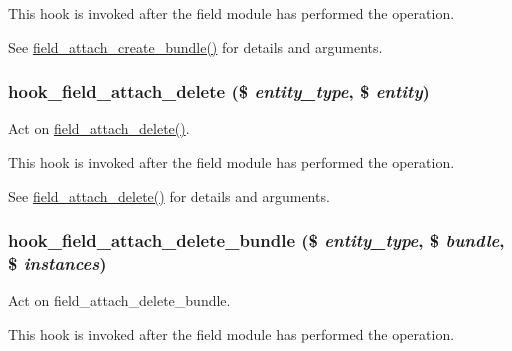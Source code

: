 This hook is invoked after the field module has performed the operation.

See \hyperlink{group__field__attach_gab3649772ef7a6416b013a4a556ce51bf}{field\_\-attach\_\-create\_\-bundle()} for details and arguments. \hypertarget{group__field__attach_gac9e5a9e43f1290315db8b593b9516094}{
\subsubsection[{hook\_\-field\_\-attach\_\-delete}]{\setlength{\rightskip}{0pt plus 5cm}hook\_\-field\_\-attach\_\-delete (\$ {\em entity\_\-type}, \/  \$ {\em entity})}}
\label{group__field__attach_gac9e5a9e43f1290315db8b593b9516094}
Act on \hyperlink{group__field__attach_gac2e3658c9c02d0d0e71359f9ef2f207a}{field\_\-attach\_\-delete()}.

This hook is invoked after the field module has performed the operation.

See \hyperlink{group__field__attach_gac2e3658c9c02d0d0e71359f9ef2f207a}{field\_\-attach\_\-delete()} for details and arguments. \hypertarget{group__field__attach_gac2aac33854dd18a2037a13b133c26481}{
\subsubsection[{hook\_\-field\_\-attach\_\-delete\_\-bundle}]{\setlength{\rightskip}{0pt plus 5cm}hook\_\-field\_\-attach\_\-delete\_\-bundle (\$ {\em entity\_\-type}, \/  \$ {\em bundle}, \/  \$ {\em instances})}}
\label{group__field__attach_gac2aac33854dd18a2037a13b133c26481}
Act on field\_\-attach\_\-delete\_\-bundle.

This hook is invoked after the field module has performed the operation.


